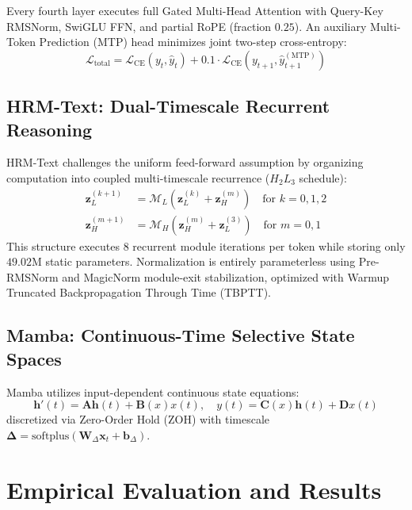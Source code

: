 \documentclass[11pt,a4paper]{article}
\begin{document}
Every fourth layer executes full Gated Multi-Head Attention with Query-Key RMSNorm, SwiGLU FFN, and partial RoPE (fraction $0.25$). An auxiliary Multi-Token Prediction (MTP) head minimizes joint two-step cross-entropy:
\begin{equation}
\mathcal{L}_{\text{total}} = \mathcal{L}_{\text{CE}}(y_t, \hat{y}_t) + 0.1 \cdot \mathcal{L}_{\text{CE}}(y_{t+1}, \hat{y}_{t+1}^{(\text{MTP})})
\end{equation}

\subsection{HRM-Text: Dual-Timescale Recurrent Reasoning}

HRM-Text \cite{wang2026hrm} challenges the uniform feed-forward assumption by organizing computation into coupled multi-timescale recurrence ($H_2L_3$ schedule):
\begin{align}
\mathbf{z}_L^{(k+1)} &= \mathcal{M}_L(\mathbf{z}_L^{(k)} + \mathbf{z}_H^{(m)}) \quad \text{for } k=0, 1, 2 \\
\mathbf{z}_H^{(m+1)} &= \mathcal{M}_H(\mathbf{z}_H^{(m)} + \mathbf{z}_L^{(3)}) \quad \text{for } m=0, 1
\end{align}
This structure executes 8 recurrent module iterations per token while storing only $49.02\text{M}$ static parameters. Normalization is entirely parameterless using Pre-RMSNorm and MagicNorm module-exit stabilization, optimized with Warmup Truncated Backpropagation Through Time (TBPTT).

\subsection{Mamba: Continuous-Time Selective State Spaces}

Mamba \cite{gu2023mamba} utilizes input-dependent continuous state equations:
\begin{equation}
\mathbf{h}'(t) = \mathbf{A} \mathbf{h}(t) + \mathbf{B}(x) x(t), \quad y(t) = \mathbf{C}(x) \mathbf{h}(t) + \mathbf{D} x(t)
\end{equation}
discretized via Zero-Order Hold (ZOH) with timescale $\boldsymbol{\Delta} = \text{softplus}(\mathbf{W}_\Delta \mathbf{x}_t + \mathbf{b}_\Delta)$.

\section{Empirical Evaluation and Results}
\label{sec:results}
\end{document}
